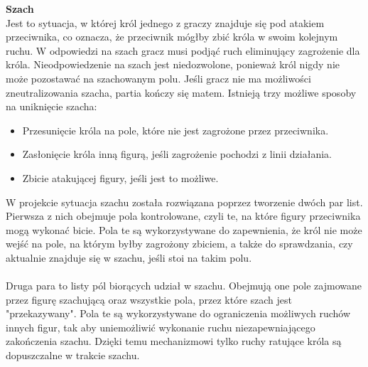 \documentclass[twoside]{projektInzynierskiMS1}
\begin{document}
\newpage

\noindent \textbf{Szach}\\
Jest to sytuacja, w której król jednego z graczy znajduje się pod atakiem przeciwnika, co oznacza, że przeciwnik mógłby zbić króla w swoim kolejnym ruchu. W odpowiedzi na szach gracz musi podjąć ruch eliminujący zagrożenie dla króla. Nieodpowiedzenie na szach jest niedozwolone, ponieważ król nigdy nie może pozostawać na szachowanym polu. Jeśli gracz nie ma możliwości zneutralizowania szacha, partia kończy się matem. Istnieją trzy możliwe sposoby na uniknięcie szacha:

\begin{itemize}
    \item Przesunięcie króla na pole, które nie jest zagrożone przez przeciwnika.
    \item Zasłonięcie króla inną figurą, jeśli zagrożenie pochodzi z linii działania.
    \item Zbicie atakującej figury, jeśli jest to możliwe.
\end{itemize}

\noindent
W projekcie sytuacja szachu została rozwiązana poprzez tworzenie dwóch par list. Pierwsza z nich obejmuje pola kontrolowane, czyli te, na które figury przeciwnika mogą wykonać bicie. Pola te są wykorzystywane do zapewnienia, że król nie może wejść na pole, na którym byłby zagrożony zbiciem, a także do sprawdzania, czy aktualnie znajduje się w szachu, jeśli stoi na takim polu.
\\\\
Druga para to listy pól biorących udział w szachu. Obejmują one pole zajmowane przez figurę szachującą oraz wszystkie pola, przez które szach jest "przekazywany". Pola te są wykorzystywane do ograniczenia możliwych ruchów innych figur, tak aby uniemożliwić wykonanie ruchu niezapewniającego zakończenia szachu. Dzięki temu mechanizmowi tylko ruchy ratujące króla są dopuszczalne w trakcie szachu.
\end{document}

